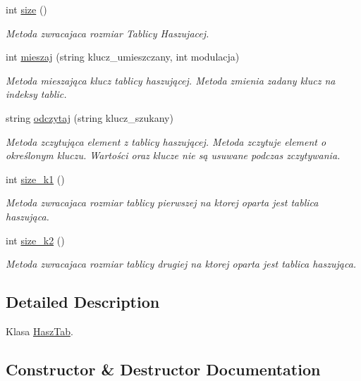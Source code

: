 \begin{DoxyCompactItemize}
int \hyperlink{a00012_a301a4903312b6c6633da230107e30963}{size} ()
\begin{DoxyCompactList}\small\item\em Metoda zwracajaca rozmiar Tablicy Haszujacej. \end{DoxyCompactList}\item 
int \hyperlink{a00012_ac30b238a4bc46128a4810f4c10d383ff}{mieszaj} (string klucz\+\_\+umieszczany, int modulacja)
\begin{DoxyCompactList}\small\item\em Metoda mieszająca klucz tablicy haszującej. Metoda zmienia zadany klucz na indeksy tablic. \end{DoxyCompactList}\item 
string \hyperlink{a00012_aad9c9ea4c22ff9c8908d85529dc2ed69}{odczytaj} (string klucz\+\_\+szukany)
\begin{DoxyCompactList}\small\item\em Metoda zczytująca element z tablicy haszującej. Metoda zczytuje element o określonym kluczu. Wartości oraz klucze nie są usuwane podczas zczytywania. \end{DoxyCompactList}\item 
int \hyperlink{a00012_ac1403ccf95523b24d42d02ff70105799}{size\+\_\+k1} ()
\begin{DoxyCompactList}\small\item\em Metoda zwracajaca rozmiar tablicy pierwszej na ktorej oparta jest tablica haszująca. \end{DoxyCompactList}\item 
int \hyperlink{a00012_ab3d50811a19340d3ec0b94edfce7ae49}{size\+\_\+k2} ()
\begin{DoxyCompactList}\small\item\em Metoda zwracajaca rozmiar tablicy drugiej na ktorej oparta jest tablica haszująca. \end{DoxyCompactList}\end{DoxyCompactItemize}


\subsection{Detailed Description}
Klasa \hyperlink{a00012}{Hasz\+Tab}. 

\subsection{Constructor \& Destructor Documentation}
\hypertarget{a00012_a8c439035d939ca124f6bfdcec24d31a6}{}
